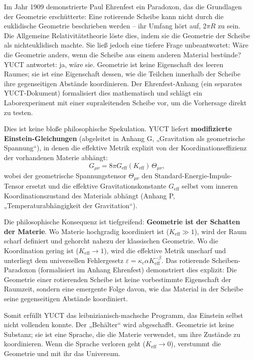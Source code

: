 \documentclass[12pt,a4paper]{article}
\begin{document}
	Im Jahr 1909 demonstrierte Paul Ehrenfest ein Paradoxon, das die Grundlagen der Geometrie erschütterte: Eine rotierende Scheibe kann nicht durch die euklidische Geometrie beschrieben werden – ihr Umfang hört auf, \(2\pi R\) zu sein. Die Allgemeine Relativitätstheorie löste dies, indem sie die Geometrie der Scheibe als nichteuklidisch machte. Sie ließ jedoch eine tiefere Frage unbeantwortet: Wäre die Geometrie anders, wenn die Scheibe aus einem anderen Material bestünde? YUCT antwortet: ja, wäre sie. Geometrie ist keine Eigenschaft des leeren Raumes; sie ist eine Eigenschaft dessen, wie die Teilchen innerhalb der Scheibe ihre gegenseitigen Abstände koordinieren. Der Ehrenfest-Anhang (ein separates YUCT-Dokument) formalisiert dies mathematisch und schlägt ein Laborexperiment mit einer supraleitenden Scheibe vor, um die Vorhersage direkt zu testen.
	
	Dies ist keine bloße philosophische Spekulation. YUCT liefert \textbf{modifizierte Einstein-Gleichungen} (abgeleitet in Anhang G, „Gravitation als geometrische Spannung“), in denen die effektive Metrik explizit von der Koordinationseffizienz der vorhandenen Materie abhängt:
	\[
	G_{\mu\nu} = 8\pi G_{\mathrm{eff}}(K_{\mathrm{eff}}) \, \Theta_{\mu\nu},
	\]
	wobei der geometrische Spannungstensor \(\Theta_{\mu\nu}\) den Standard-Energie-Impuls-Tensor ersetzt und die effektive Gravitationskonstante \(G_{\mathrm{eff}}\) selbst vom inneren Koordinationszustand des Materials abhängt (Anhang P, „Temperaturabhängigkeit der Gravitation“).
	
	Die philosophische Konsequenz ist tiefgreifend: \textbf{Geometrie ist der Schatten der Materie}. Wo Materie hochgradig koordiniert ist (\(K_{\mathrm{eff}} \gg 1\)), wird der Raum scharf definiert und gehorcht nahezu der klassischen Geometrie. Wo die Koordination gering ist (\(K_{\mathrm{eff}} \to 1\)), wird die effektive Metrik unscharf und unterliegt dem universellen Fehlergesetz \(\varepsilon = \kappa_c \alpha K_{\mathrm{eff}}^{-\beta}\). Das rotierende Scheiben-Paradoxon (formalisiert im Anhang Ehrenfest) demonstriert dies explizit: Die Geometrie einer rotierenden Scheibe ist keine vorbestimmte Eigenschaft der Raumzeit, sondern eine emergente Folge davon, wie das Material in der Scheibe seine gegenseitigen Abstände koordiniert.
	
	Somit erfüllt YUCT das leibnizianisch-machsche Programm, das Einstein selbst nicht vollenden konnte. Der „Behälter“ wird abgeschafft. Geometrie ist keine Substanz; sie ist eine Sprache, die die Materie verwendet, um ihre Zustände zu koordinieren. Wenn die Sprache verloren geht (\(K_{\mathrm{eff}} \to 0\)), verstummt die Geometrie und mit ihr das Universum.
	
\end{document}
